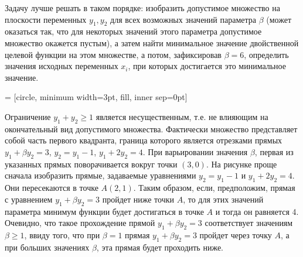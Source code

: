 \begin{solution}
Задачу лучше решать в таком порядке: изобразить допустимое множество на плоскости переменных $y_{1} ,y_{2} $ для всех возможных значений параметра $\beta $ (может оказаться так, что для некоторых значений этого параметра допустимое множество окажется пустым), а затем найти минимальное значение двойственной целевой функции на этом множестве, а потом, зафиксировав $\beta =6$, определить значения исходных переменных $x_{i} $, при которых достигается это минимальное значение.


 = [circle, minimum width=3pt, fill, inner sep=0pt]


Ограничение $y_{1} +y_{2} \ge 1$ является несущественным, т.е. не влияющим на окончательный вид допустимого множества. Фактически множество представляет собой часть первого квадранта, граница которого является отрезками прямых $y_{1} +\beta y_{2} =3$, $y_{2} =y_{1} -1$, $y_{1} +2y_{2} =4$. При варьировании значения $\beta $, первая из указанных прямых поворачивается вокруг точки $(3,0)$. На рисунке проще сначала изобразить прямые, задаваемые уравнениями $y_{2} =y_{1} -1$ и $y_{1} +2y_{2} =4$. Они пересекаются в точке $A(2,1)$. Таким образом, если, предположим, прямая с уравнением  $y_{1} +\beta y_{2} =3$ пройдет ниже точки $A$, то для этих значений параметра минимум функции будет достигаться в точке $A$ и тогда он равняется 4. Очевидно, что такое прохождение прямой $y_{1} +\beta y_{2} =3$ соответствует значениям $\beta \ge 1$, ввиду того, что при $\beta =1$ прямая $y_{1} +\beta y_{2} =3$ пройдет через точку $A$, а при больших значениях $\beta $, эта прямая будет проходить ниже.


\end{solution}
